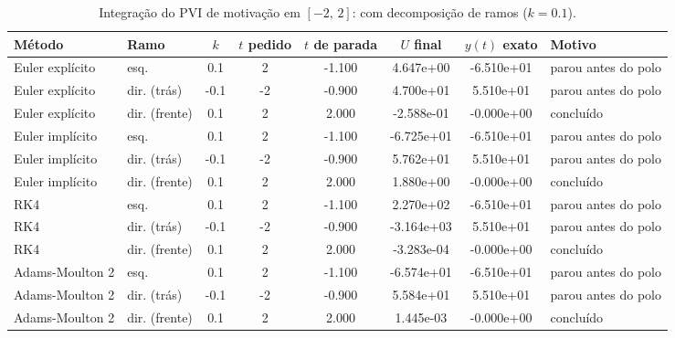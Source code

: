 \begin{table}[H]
    \centering
    \small
    \begin{tabular}{llcccccl}
        \hline
        Método & Ramo & $k$ & $t$ pedido & $t$ de parada & $U$ final & $y(t)$ exato & Motivo \\
        \hline
        Euler explícito & esq. & 0.1 & 2 & -1.100 & 4.647e+00 & -6.510e+01 & parou antes do polo \\
        Euler explícito & dir. (trás) & -0.1 & -2 & -0.900 & 4.700e+01 & 5.510e+01 & parou antes do polo \\
        Euler explícito & dir. (frente) & 0.1 & 2 & 2.000 & -2.588e-01 & -0.000e+00 & concluído \\
        Euler implícito & esq. & 0.1 & 2 & -1.100 & -6.725e+01 & -6.510e+01 & parou antes do polo \\
        Euler implícito & dir. (trás) & -0.1 & -2 & -0.900 & 5.762e+01 & 5.510e+01 & parou antes do polo \\
        Euler implícito & dir. (frente) & 0.1 & 2 & 2.000 & 1.880e+00 & -0.000e+00 & concluído \\
        RK4 & esq. & 0.1 & 2 & -1.100 & 2.270e+02 & -6.510e+01 & parou antes do polo \\
        RK4 & dir. (trás) & -0.1 & -2 & -0.900 & -3.164e+03 & 5.510e+01 & parou antes do polo \\
        RK4 & dir. (frente) & 0.1 & 2 & 2.000 & -3.283e-04 & -0.000e+00 & concluído \\
        Adams-Moulton 2 & esq. & 0.1 & 2 & -1.100 & -6.574e+01 & -6.510e+01 & parou antes do polo \\
        Adams-Moulton 2 & dir. (trás) & -0.1 & -2 & -0.900 & 5.584e+01 & 5.510e+01 & parou antes do polo \\
        Adams-Moulton 2 & dir. (frente) & 0.1 & 2 & 2.000 & 1.445e-03 & -0.000e+00 & concluído \\
        \hline
    \end{tabular}
    \caption{Integração do PVI de motivação em $[-2,\, 2]$: com decomposição de ramos ($k = 0.1$).}
    \label{tab:m2_2_cd}
\end{table}
